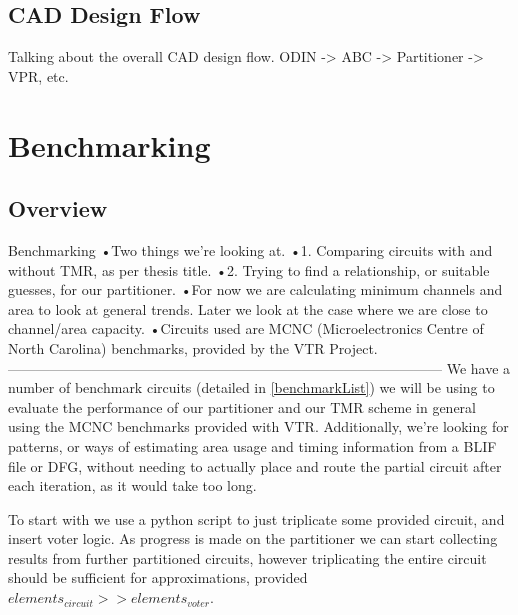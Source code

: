 \documentclass[12pt,draft,a4paper,oneside]{memoir} %
\begin{document}
\section{CAD Design Flow}
Talking about the overall CAD design flow. ODIN -> ABC -> Partitioner -> VPR, etc.


\chapter{Benchmarking}
\section{Overview}
Benchmarking
•Two things we’re looking at.
•1. Comparing circuits with and without TMR, as per thesis title.
•2. Trying to find a relationship, or suitable guesses, for our partitioner.
•For now we are calculating minimum channels and area to look at general trends. Later we look at the case where we are close to channel/area capacity.
•Circuits used are MCNC (Microelectronics Centre of North Carolina) benchmarks, provided by the VTR Project.
---------------------------------------------------------------------------------------------
We have a number of benchmark circuits (detailed in \ref{benchmarkList}) we will be using to evaluate the performance of our partitioner and our \ac{TMR} scheme in general using the \ac{MCNC} benchmarks provided with \ac{VTR}.
Additionally, we're looking for patterns, or ways of estimating area usage and timing information from a \ac{BLIF} file or \ac{DFG}, without needing to actually place and route the partial circuit after each iteration, as it would take too long.

To start with we use a python script to just triplicate some provided circuit, and insert voter logic. As progress is made on the partitioner we can start collecting results from further partitioned circuits, however triplicating the entire circuit should be sufficient for approximations, provided $elements_{circuit} >> elements_{voter}$.
\end{document}
